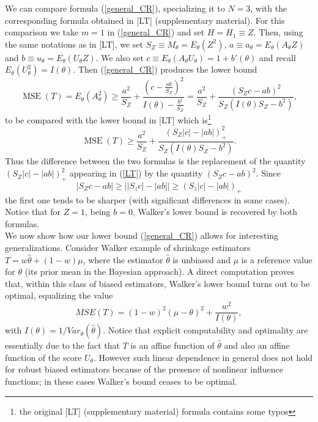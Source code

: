 \documentclass[10pt,a4paper]{amsart}
\begin{document}
We can compare formula (\ref{general_CR}), specializing it  to $N=3$, with the corresponding formula obtained in [LT] (supplementary material). For this comparison we take $m=1$ in (\ref{general_CR}) and set $H=H_1\equiv Z$. Then, using the same notations as in [LT], we set
$S_Z\equiv M_\theta=E_\theta(Z^2)$, $a\equiv a_\theta=E_\theta(A_\theta Z)$ and $b\equiv u_\theta=E_\theta(U_\theta Z)$.
We also set $c\equiv E_\theta(A_\theta U_\theta)=1+b'(\theta)$ and recall $E_\theta(U_\theta^2)=I(\theta)$. Then (\ref{general_CR}) produces the lower bound
\begin{equation}\label{me}
\operatorname{MSE}(T)=E_\theta(A_\theta^2)
\geq
\frac{a^2}{S_Z}
+
\frac{
\left(
c-\frac{ab}{S_Z}
\right)^2
}{
I(\theta)-\frac{b^2}{S_Z}
}=\frac{a^2}{S_Z}
+
\frac{
\left(
S_Zc-ab
\right)^2
}{
S_Z\left(I(\theta)S_Z-b^2\right)
},
\end{equation}
to be compared with the lower bound in [LT] which is\footnote{the original [LT] (supplementary material) formula contains some typos}
\begin{equation}\label{LT}
\operatorname{MSE}(T)
\geq
\frac{a^2}{S_Z}
+
\frac{
\left(
S_Z|c|-|ab|
\right)_{+}^2
}{
S_Z\left(I(\theta)S_Z-b^2\right)
}.
\end{equation}
Thus the difference between the two formulas is the replacement of the quantity  $(S_Z|c|-|ab|)^2_{+}$ appearing in (\ref{LT}) by the quantity $(S_Zc-ab)^2$. Since
$$
|S_Zc-ab|\geq \bigg||S_zc|-|ab|\bigg|\geq (S_z|c|-|ab|)_{+}
$$
 the first one tends to be sharper (with significant differences  in some cases). Notice that for $Z=1$, being $b=0$, Walker's lower bound is recovered by both formulas.\\
We now show how our lower bound (\ref{general_CR}) allows for interesting generalizations. Consider Walker example of shrinkage estimators $T=w\widehat\theta+(1-w)\mu$, where the estimator $\widehat\theta$ is unbiased and $\mu$ is a reference value for $\theta$ (its prior mean in the Bayesian approach). A direct computation proves that, within this class of biased estimators, Walker's lower bound turns out to be optimal, equalizing the value
\begin{equation}\label{optimal}
MSE(T)=(1-w)^2(\mu-\theta)^2+\frac{w^2}{I(\theta)},
\end{equation}
with $I(\theta)=1/Var_{\theta}(\widehat\theta)$. Notice that explicit computability and optimality  are essentially due to the fact that $T$ is an affine function of $\widehat\theta$ and also an affine function of the score $U_{\theta}$. However such linear dependence in general does not hold for robust biased estimators because of the presence of nonlinear influence functions; in these cases Walker's bound ceases to be optimal.\\
\end{document}
